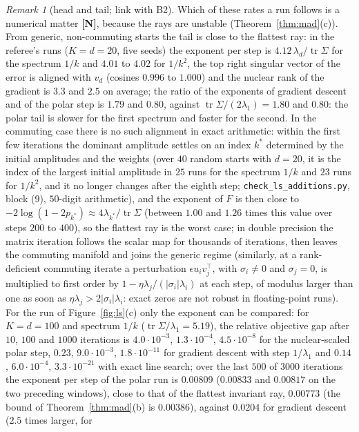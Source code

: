 \documentclass[11pt]{article}
\theoremstyle{definition}
\theoremstyle{remark}
\newtheorem{remark}[theorem]{Remark}
\newcommand{\abs}[1]{\left|#1\right|}
\newcommand{\tr}{\operatorname{tr}}
\begin{document}
\begin{remark}[head and tail; link with B2]
Which of these rates a run follows is a numerical matter \textbf{[N]}, because the rays are unstable
(Theorem~\ref{thm:mad}(c)). From generic, non-commuting starts the tail is close to the flattest ray: in the
referee's runs ($K=d=20$, five seeds) the exponent per step is $4.12\,\lambda_d/\tr\Sigma$ for the spectrum $1/k$ and
$4.01$ to $4.02$ for $1/k^2$, the top right singular vector of the error is aligned with $v_d$ (cosines $0.996$ to
$1.000$) and the nuclear rank of the gradient is $3.3$ and $2.5$ on average; the ratio of the exponents of gradient descent and of
the polar step is $1.79$ and $0.80$, against $\tr\Sigma/(2\lambda_1)=1.80$ and $0.80$: the polar tail is slower for the
first spectrum and faster for the second. In the commuting case there is no such alignment in exact arithmetic: within
the first few iterations the dominant amplitude settles on an index $k^\ast$ determined by the initial amplitudes and
the weights (over $40$ random starts with $d=20$, it is the index of the largest initial amplitude in $25$ runs for the
spectrum $1/k$ and $23$ runs for $1/k^2$, and it no longer changes after the eighth step;
\texttt{check\_ls\_additions.py}, block (9), $50$-digit arithmetic), and the exponent of $F$ is then close to
$-2\log(1-2p_{k^\ast})\approx4\lambda_{k^\ast}/\tr\Sigma$ (between $1.00$ and $1.26$ times this value over steps $200$ to
$400$), so the flattest ray is the worst case; in double precision the matrix iteration follows
the scalar map for thousands of iterations, then leaves the commuting manifold and joins the generic regime
(similarly, at a rank-deficient commuting iterate a perturbation $\epsilon u_iv_j^\top$, with $\sigma_i\ne0$ and
$\sigma_j=0$, is multiplied to first order by $1-\eta\lambda_j/(\abs{\sigma_i}\lambda_i)$ at each step, of modulus larger
than one as soon as $\eta\lambda_j>2\abs{\sigma_i}\lambda_i$: exact zeros are not robust in floating-point runs). For
the run of Figure~\ref{fig:ls}(c) only the exponent can be compared: for $K=d=100$ and spectrum $1/k$
($\tr\Sigma/\lambda_1=5.19$), the relative objective gap after $10$, $100$ and $1000$ iterations is
$4.0\cdot10^{-3}$, $1.3\cdot10^{-4}$, $4.5\cdot10^{-8}$ for the nuclear-scaled polar step, $0.23$, $9.0\cdot10^{-3}$,
$1.8\cdot10^{-11}$ for gradient descent with step $1/\lambda_1$ and $0.14$, $6.0\cdot10^{-4}$, $3.3\cdot10^{-21}$ with
exact line search; over the last $500$ of $3000$ iterations the exponent per step of the polar run is $0.00809$
($0.00833$ and $0.00817$ on the two preceding windows), close to that of the flattest invariant ray, $0.00773$ (the
bound of Theorem~\ref{thm:mad}(b) is $0.00386$), against $0.0204$ for gradient descent ($2.5$ times larger, for

\end{remark}
\end{document}
